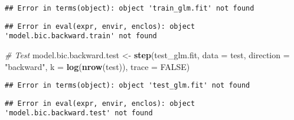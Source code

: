 \documentclass[]{article}
\newenvironment{Shaded}{\begin{snugshade}}{\end{snugshade}}
\newcommand{\CommentTok}[1]{\textcolor[rgb]{0.56,0.35,0.01}{\textit{#1}}}
\newcommand{\DataTypeTok}[1]{\textcolor[rgb]{0.13,0.29,0.53}{#1}}
\newcommand{\DecValTok}[1]{\textcolor[rgb]{0.00,0.00,0.81}{#1}}
\newcommand{\KeywordTok}[1]{\textcolor[rgb]{0.13,0.29,0.53}{\textbf{#1}}}
\newcommand{\NormalTok}[1]{#1}
\newcommand{\OperatorTok}[1]{\textcolor[rgb]{0.81,0.36,0.00}{\textbf{#1}}}
\newcommand{\OtherTok}[1]{\textcolor[rgb]{0.56,0.35,0.01}{#1}}
\newcommand{\StringTok}[1]{\textcolor[rgb]{0.31,0.60,0.02}{#1}}
\begin{document}
\begin{verbatim}
## Error in terms(object): object 'train_glm.fit' not found
\end{verbatim}

\begin{Shaded}
\end{Shaded}

\begin{verbatim}
## Error in eval(expr, envir, enclos): object 'model.bic.backward.train' not found
\end{verbatim}

\begin{Shaded}
\begin{Highlighting}[]
\CommentTok{# Test}
\NormalTok{model.bic.backward.test <-}\StringTok{ }\KeywordTok{step}\NormalTok{(test_glm.fit, }\DataTypeTok{data =}\NormalTok{ test, }\DataTypeTok{direction =} \StringTok{"backward"}\NormalTok{, }\DataTypeTok{k =} \KeywordTok{log}\NormalTok{(}\KeywordTok{nrow}\NormalTok{(test)), }\DataTypeTok{trace =} \OtherTok{FALSE}\NormalTok{)}
\end{Highlighting}
\end{Shaded}

\begin{verbatim}
## Error in terms(object): object 'test_glm.fit' not found
\end{verbatim}

\begin{Shaded}
\end{Shaded}

\begin{verbatim}
## Error in eval(expr, envir, enclos): object 'model.bic.backward.test' not found
\end{verbatim}
\end{document}
